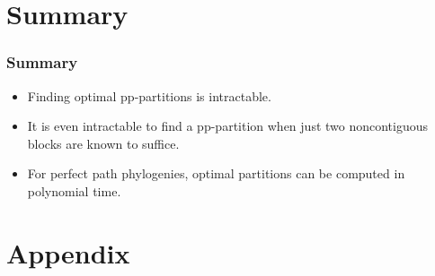 \documentclass[aspectratio=169]{beamer}
\begin{document}
\section*{Summary}

\begin{frame}
  \frametitle<presentation>{Summary}

  \begin{itemize}
  \item
    Finding optimal pp-partitions is \alert{intractable}. 
  \item
    It is even intractable to find a pp-partition when \alert{just two 
      noncontiguous  blocks are known to suffice}.
  \item
    For perfect \alert{path} phylogenies, optimal partitions can be
    computed \alert{in polynomial time}.
  \end{itemize}
\end{frame}


\appendix

\section*{Appendix}
\end{document}
